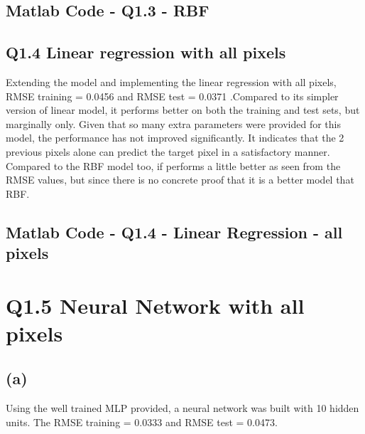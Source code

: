 \documentclass[english]{article}
\begin{document}
\subsection*{Matlab Code - Q1.3 - RBF}



\subsection*{Q1.4 Linear regression with all pixels }
Extending the model and implementing the linear regression with all pixels,
RMSE training = 0.0456  and RMSE test = 0.0371 .Compared to its simpler version of linear model, it performs better on both the training and test sets, but marginally only. Given that so many extra
parameters were provided for this model, the performance has not improved significantly. It indicates
that the 2 previous pixels alone can predict the target pixel in a satisfactory manner.
Compared to the RBF model too, if performs a little better as seen from the RMSE values, but since
there is no  concrete proof that it is a better model that RBF.

\subsection*{Matlab Code - Q1.4 - Linear Regression - all pixels}


\section*{Q1.5 Neural Network with all pixels }
\subsection*{(a)} 

Using the well trained MLP provided, a neural network was built with 10 hidden units. The  
RMSE training = 0.0333  and RMSE test = 0.0473.
\end{document}
